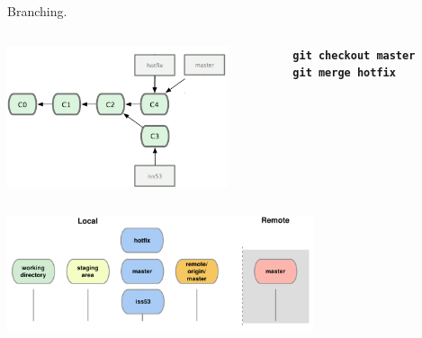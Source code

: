 \documentclass{beamer}
\begin{document}
\begin{frame}{Branching.}
  \begin{columns}
    \begin{column}{0.6\linewidth}
      \begin{center}
        \includegraphics[width=6.5cm]{figs/18333fig0314c-tn}
      \end{center}
    \end{column}
    \begin{column}{0.45\linewidth}
      \begin{center}
        \texttt{\textbf{git checkout master}}\\
        \texttt{\textbf{git merge hotfix}}\\
      \end{center}
    \end{column}
  \end{columns}
  \begin{center}
    \includegraphics[width=9cm]{figs/git-branch2}
  \end{center}
\end{frame}
\end{document}
